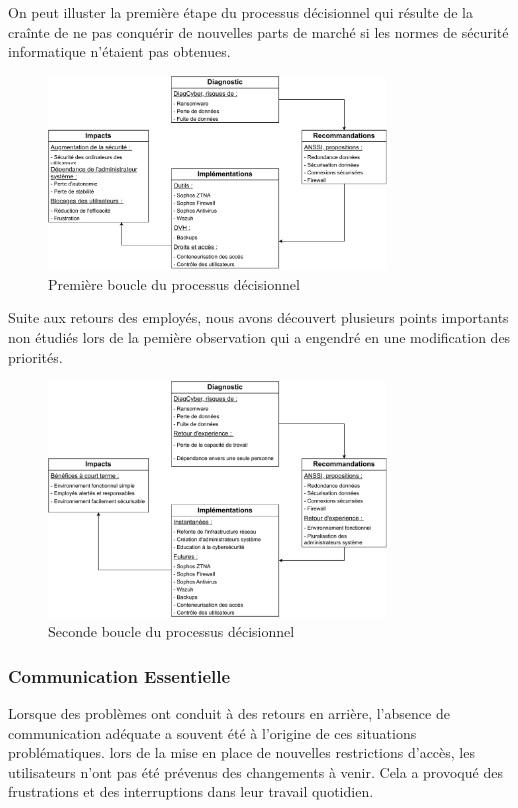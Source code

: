 On peut illuster la première étape du processus décisionnel qui résulte de la craînte de ne pas conquérir de nouvelles parts de marché si les normes de sécurité informatique n'étaient pas obtenues.
\newpage
\begin{figure}[ht!]
    \centering
    \includegraphics[width=0.8\textwidth]{paper/figures/boucle1.pdf}
    \caption{Première boucle du processus décisionnel}
    \label{fig:boucle1}
\end{figure}

Suite aux retours des employés, nous avons découvert plusieurs points importants non étudiés lors de la pemière observation qui a engendré en une modification des priorités.

\begin{figure}[ht!]
    \centering
    \includegraphics[width=0.8\textwidth]{paper/figures/boucle2.pdf}
    \caption{Seconde boucle du processus décisionnel}
    \label{fig:boucle2}
\end{figure}

\subsubsection{Communication Essentielle}
Lorsque des problèmes ont conduit à des retours en arrière, l'absence de communication adéquate a souvent été à l'origine de ces situations problématiques.
lors de la mise en place de nouvelles restrictions d'accès, les utilisateurs n'ont pas été prévenus des changements à venir.
Cela a provoqué des frustrations et des interruptions dans leur travail quotidien.

